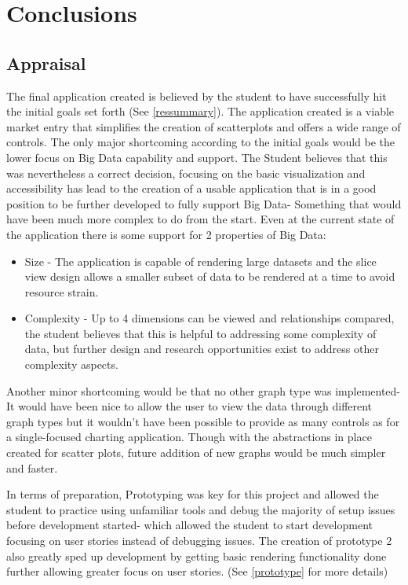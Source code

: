 \section{Conclusions}

\subsection{Appraisal}
The final application created is believed by the student to have successfully hit the initial goals set forth (See \ref{ressummary}). The application created is a viable market entry that simplifies the creation of scatterplots and offers a wide range of controls. The only major shortcoming according to the initial goals would be the lower focus on Big Data capability and support. The Student believes that this was nevertheless a correct decision, focusing on the basic visualization and accessibility has lead to the creation of a usable application that is in a good position to be further developed to fully support Big Data- Something that would have been much more complex to do from the start. Even at the current state of the application there is some support for 2 properties \cite[]{6612229} of Big Data:
\begin{itemize}
    \item Size - The application is capable of rendering large datasets and the slice view design allows a smaller subset of data to be rendered at a time to avoid resource strain.
    \item Complexity -  Up to 4 dimensions can be viewed and relationships compared, the student believes that this is helpful to addressing some complexity of data, but further design and research opportunities exist to address other complexity aspects. \cite[]{6612229}
\end{itemize}

Another minor shortcoming would be that no other graph type was implemented- It would have been nice to allow the user to view the data through different graph types but it wouldn't have been possible to provide as many controls as for a single-focused charting application. Though with the abstractions in place created for scatter plots, future addition of new graphs would be much simpler and faster.

In terms of preparation, Prototyping was key for this project and allowed the student to practice using unfamiliar tools and debug the majority of setup issues before development started- which allowed the student to start development focusing on user stories instead of debugging issues. The creation of prototype 2 also greatly sped up development by getting basic rendering functionality done further allowing greater focus on user stories. (See \ref{prototype} for more details)

